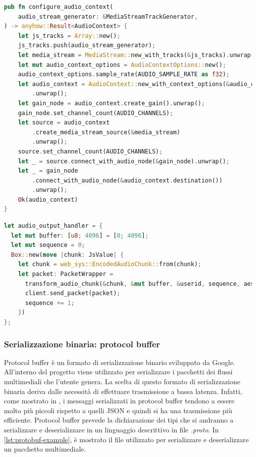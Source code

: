 \documentclass{article}
\begin{document}
\begin{lstlisting}[language=Rust, style=boxed, label={lst:decoder-params}, captionpos=b,caption={Configurazione audio stereo per il decoder OPUS}]
pub fn configure_audio_context(
    audio_stream_generator: &MediaStreamTrackGenerator,
) -> anyhow::Result<AudioContext> {
    let js_tracks = Array::new();
    js_tracks.push(audio_stream_generator);
    let media_stream = MediaStream::new_with_tracks(&js_tracks).unwrap();
    let mut audio_context_options = AudioContextOptions::new();
    audio_context_options.sample_rate(AUDIO_SAMPLE_RATE as f32);
    let audio_context = AudioContext::new_with_context_options(&audio_context_options)
        .unwrap();
    let gain_node = audio_context.create_gain().unwrap();
    gain_node.set_channel_count(AUDIO_CHANNELS);
    let source = audio_context
        .create_media_stream_source(&media_stream)
        .unwrap();
    source.set_channel_count(AUDIO_CHANNELS);
    let _ = source.connect_with_audio_node(&gain_node).unwrap();
    let _ = gain_node
        .connect_with_audio_node(&audio_context.destination())
        .unwrap();
    Ok(audio_context)
}

\end{lstlisting}


\begin{lstlisting}[language=Rust, style=boxed, label={lst:encoder-buffer-size}, captionpos=b,caption={Riduzione del buffer size per l'encoder OPUS}]
let audio_output_handler = {
  let mut buffer: [u8; 4096] = [0; 4096];
  let mut sequence = 0;
  Box::new(move |chunk: JsValue| {
    let chunk = web_sys::EncodedAudioChunk::from(chunk);
    let packet: PacketWrapper =
      transform_audio_chunk(&chunk, &mut buffer, &userid, sequence, aes.clone());
      client.send_packet(packet);
      sequence += 1;
    })
};

\end{lstlisting}

\subsubsection{Serializzazione binaria: protocol buffer} 
Protocol buffer \cite{ProtcolBuffer} è un formato di serializzazione binario sviluppato da Google. All'interno 
del progetto viene utilizzato per serializzare i pacchetti dei flussi multimediali che 
l'utente genera. La scelta di questo formato di serializzazione binaria deriva dalle necessità 
di effettuare trasmissione a bassa latenza. Infatti, come mostrato in \cite{popic2016performance},
i messaggi serializzati in protocol buffer tendono a essere molto più piccoli rispetto a quelli
JSON e quindi si ha una trasmissione più efficiente. Protocol buffer prevede la dichiarazione dei tipi
che si andranno a serializzare e deserializzare in un linguaggio descrittivo in file \textit{.proto}. 
In \cref{lst:protobuf-example}, è mostrato il file utilizzato per serializzare e 
deserializzare un pacchetto multimediale.
\end{document}
